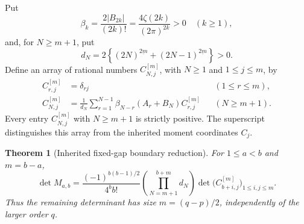 \documentclass[11pt,letterpaper]{article}
\numberwithin{equation}{section}
\theoremstyle{plain}
\newtheorem{theorem}{Theorem}[section]
\theoremstyle{definition}
\theoremstyle{remark}
\begin{document}
Put
\begin{equation}\label{gap:beta}
 \beta_k=\frac{2|B_{2k}|}{(2k)!}
        =\frac{4\zeta(2k)}{(2\pi)^{2k}}>0\quad(k\ge1),
\end{equation}
and, for $N\ge m+1$, put
\begin{equation}\label{gap:d}
 d_N=2\left\{(2N)^{\underline{2m}}+
                    (2N-1)^{\underline{2m}}\right\}>0.
\end{equation}
Define an array of rational numbers $C_{N,j}^{[m]}$, with
$N\ge1$ and $1\le j\le m$, by
\begin{align}
 C_{r,j}^{[m]}&=\delta_{rj}&& (1\le r\le m),
 \label{gap:initial}\\
 C_{N,j}^{[m]}&=\frac1{d_N}\sum_{r=1}^{N-1}
 \beta_{N-r}(A_r+B_N)C_{r,j}^{[m]}
 &&(N\ge m+1).
 \label{gap:recurrence}
\end{align}
Every entry $C_{N,j}^{[m]}$ with $N\ge m+1$ is strictly positive.
The superscript distinguishes this array from the inherited moment
coordinates $C_j$.

\begin{theorem}[Inherited fixed-gap boundary reduction]
\label{gap:complementary}
For $1\le a<b$ and $m=b-a$,
\begin{equation}\label{gap:complementary-formula}
 \det M_{a,b}
 =\frac{(-1)^{b(b-1)/2}}{4^bb!}
 \left(\prod_{N=m+1}^{b+m}d_N\right)
 \det\bigl(C_{b+i,j}^{[m]}\bigr)_{1\le i,j\le m}.
\end{equation}
Thus the remaining determinant has size $m=(q-p)/2$, independently
of the larger order $q$.
\end{theorem}
\end{document}
